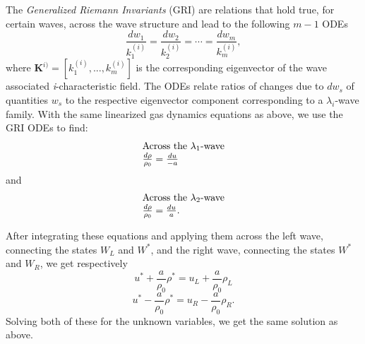 \documentclass[]{article}
\begin{document}
			The \textit{Generalized Riemann Invariants} (GRI) are relations that hold true, for certain waves, across the wave structure and lead to the following $ m-1 $ ODEs
			\begin{equation}
				\frac{dw_1}{k_1^{(i)}} = \frac{dw_2}{k_2^{(i)}} = \cdots = \frac{dw_m}{k_m^{(i)}},
			\end{equation}
			where $ \textbf{K}^{i)} = [k_1^{(i)},...,k_m^{(i)}]$ is the corresponding eigenvector of the wave associated \textit{i}-characteristic field. The ODEs relate ratios of changes due to $ dw_s $ of quantities $ w_s $ to the respective eigenvector component corresponding to a $ \lambda_i $-wave family. With the same linearized gas dynamics equations as above, we use the GRI ODEs to find:
			\begin{equation}
				\begin{aligned}
					\begin{array}{ll}
						\mbox{Across the $ \lambda_1 $-wave} \\
						\frac{d\rho}{\rho_0} = \frac{du}{-a}
					\end{array}
				\end{aligned}			
			\end{equation}
			and
			\begin{equation} 
				\begin{aligned}
					\begin{array}{ll}
						\mbox{Across the $ \lambda_2 $-wave} \\
						\frac{d\rho}{\rho_0} = \frac{du}{a}.
					\end{array}
				\end{aligned}			
			\end{equation}
		
			After integrating these equations and applying them across the left wave, connecting the states $ W_L $ and $ W^* $, and the right wave, connecting the states $ W^* $ and $ W_R $, we get respectively
			\begin{equation}
				u^* + \frac{a}{\rho_0} \rho^* = u_L + \frac{a}{\rho_0}\rho_L
			\end{equation}
			\begin{equation}
				u^* - \frac{a}{\rho_0} \rho^* = u_R - \frac{a}{\rho_0}\rho_R.
			\end{equation}
			Solving both of these for the unknown variables, we get the same solution as above.
		
\end{document}
